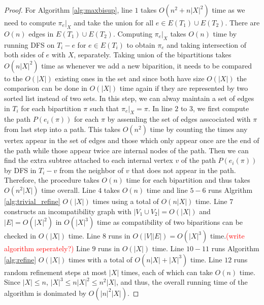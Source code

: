 \documentclass{bmcart}
\newcommand{\note}[1]{\textcolor{red}{#1}}
\begin{document}
\begin{proof}
For Algorithm \ref{alg:maxbisup}, line $1$ takes $O(n^2+ n|X|^2)$ time as we need to compute $\pi_e|_X$ and take the union for all $e \in E(T_1) \cup E(T_2)$. There are $O(n)$ edges in $E(T_1) \cup E(T_2)$. Computing $\pi_e|_X$ takes $O(n)$ time by running DFS on $T_i - e$ for $e \in E(T_i)$ to obtain $\pi_e$ and taking intersection of both sides of $e$ with $X$, separately. Taking union of the bipartitions takes $O(n |X|^2)$ time as whenever we add a new biparition, it needs to be compared to the $O(|X|)$ existing ones in the set and since both have size $O(|X|)$ the comparison can be done in $O(|X|)$ time again if they are represented by two sorted list instead of two sets. In this step, we can alway maintain a set of edges in $T_i$ for each bipartition $\pi$ such that $\pi_e|_X = \pi$. In line $2$ to $3$, we first compute the path $P(e_i(\pi))$ for each $\pi$ by assemling the set of edges asscociated with $\pi$ from last step into a path. This takes $O(n^2)$ time by counting the times any vertex appear in the set of edges and those which only appear once are the end of the path while those appear twice are internal nodes of the path. Then we can find the extra subtree attached to each internal vertex $v$ of the path $P(e_i(\pi))$ by DFS in $T_i - v$ from the neighbor of $v$ that does not appear in the path. Therefore, the procedure takes $O(n)$ time for each bipartition and thus takes $O(n^2|X|)$ time overall. Line $4$ takes $O(n)$ time and line $5-6$ runs Algrithm \ref{alg:trivial_refine} $O(|X|)$ times using a total of $O(n|X|)$ time. Line $7$ constructs an incompatibility graph with $|V_1\cup V_2| = O(|X|)$ and $|E| = O(|X|^2)$ in $O(|X|^3)$ time as compatibility of two biparitions can be checked in $O(|X|)$ time. Line $8$ runs in $O(|V||E|) = O(|X|^3)$ time.\note{(write algorithm seperately?)} Line $9$ runs in $O(|X|)$ time. Line $10-11$ runs Algorithm \ref{alg:refine} $O(|X|)$ times with a total of $O(n|X|+|X|^3)$ time. Line $12$ runs random refinement steps at most $|X|$ times, each of which can take $O(n)$ time. Since $|X| \le n$, $|X|^3 \le n|X|^2 \le n^2|X|$, and thus, the overall running time of the algorithm is donimated by $O(|n|^2|X|)$.
\end{proof}

\end{document}
